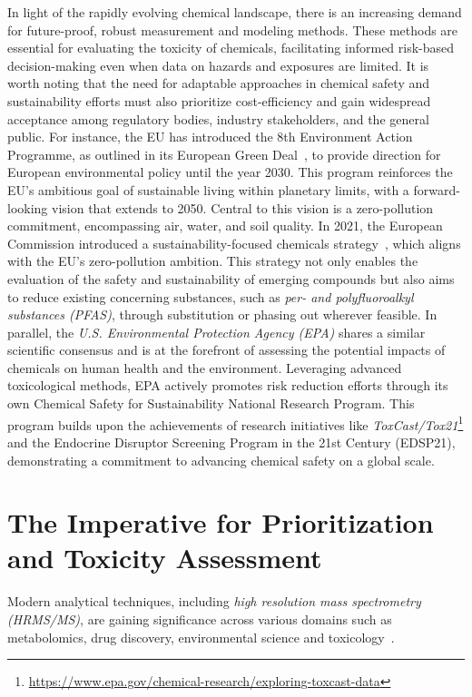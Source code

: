 In light of the rapidly evolving chemical landscape, there is an increasing demand for future-proof, robust measurement and modeling methods. These methods are essential for evaluating the toxicity of chemicals, facilitating informed risk-based decision-making even when data on hazards and exposures are limited. It is worth noting that the need for adaptable approaches in chemical safety and sustainability efforts must also prioritize cost-efficiency and gain widespread acceptance among regulatory bodies, industry stakeholders, and the general public. For instance, the EU has introduced the 8th Environment Action Programme, as outlined in its European Green Deal~\cite{greendeal}, to provide direction for European environmental policy until the year 2030. This program reinforces the EU's ambitious goal of sustainable living within planetary limits, with a forward-looking vision that extends to 2050. Central to this vision is a zero-pollution commitment, encompassing air, water, and soil quality. In 2021, the European Commission introduced a sustainability-focused chemicals strategy~\cite{EUChemicalsStrategy}, which aligns with the EU's zero-pollution ambition. This strategy not only enables the evaluation of the safety and sustainability of emerging compounds but also aims to reduce existing concerning substances, such as \emph{per- and polyfluoroalkyl substances (PFAS)}, through substitution or phasing out wherever feasible. In parallel, the \emph{U.S. Environmental Protection Agency (EPA)} shares a similar scientific consensus and is at the forefront of assessing the potential impacts of chemicals on human health and the environment. Leveraging advanced toxicological methods, EPA actively promotes risk reduction efforts through its own Chemical Safety for Sustainability National Research Program. This program builds upon the achievements of research initiatives like \emph{ToxCast/Tox21}\footnote{\url{https://www.epa.gov/chemical-research/exploring-toxcast-data}} and the Endocrine Disruptor Screening Program in the 21st Century (EDSP21), demonstrating a commitment to advancing chemical safety on a global scale.


\section{The Imperative for Prioritization and Toxicity Assessment}

Modern analytical techniques, including \emph{high resolution mass spectrometry (HRMS/MS)}, are gaining significance across various domains such as metabolomics, drug discovery, environmental science and toxicology~\cite{tamara2022}.

